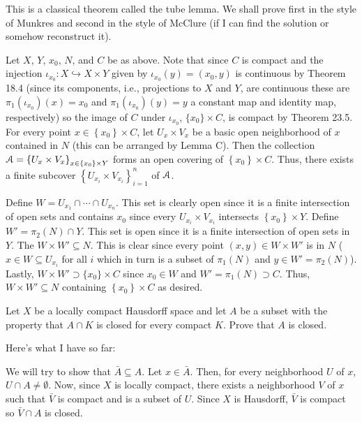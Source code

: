 \begin{solution}
  This is a classical theorem called the tube lemma. We shall prove first
  in the style of Munkres and second in the style of McClure (if I can find
  the solution or somehow reconstruct it).

  Let $X$, $Y$, $x_0$, $N$, and $C$ be as above. Note that since $C$ is
  compact and the injection $\iota_{x_0}\colon X\hookrightarrow X\times Y$
  given by $\iota_{x_0}(y)=(x_0,y)$ is continuous by Theorem 18.4 (since
  its components, i.e., projections to $X$ and $Y$, are continuous these
  are $\pi_1(\iota_{x_0})(x)=x_0$ and $\pi_1(\iota_{x_0})(y)=y$ a constant
  map and identity map, respectively) so the image of $C$ under
  $\iota_{x_0}$, $\{x_0\}\times C$, is compact by Theorem 23.5. For every
  point $x\in\left\{x_0\right\}\times C$, let $U_x\times V_x$ be a basic
  open neighborhood of $x$ contained in $N$ (this can be arranged by Lemma
  C). Then the collection
  $\mathcal{A}=\left\{U_x\times V_x\right\}_{x\in\left\{x_0\right\}\times Y}$
  forms an open covering of $\left\{x_0\right\}\times C$. Thus, there
  exists a finite subcover $\left\{U_{x_i}\times V_{x_i}\right\}_{i=1}^n$
  of $\mathcal{A}$.

  Define $W= U_{x_1}\cap\dotsb\cap U_{x_n}$. This set is clearly open since
  it is a finite intersection of open sets and contains $x_0$ since every
  $U_{x_i}\times V_{x_i}$ intersects $\left\{x_0\right\}\times Y$. Define
  $W'=\pi_2(N)\cap Y$. This set is open since it is a finite intersection
  of open sets in $Y$. The $W\times W'\subseteq N$. This is clear since every
  point $(x,y)\in W\times W'$ is in $N$ ($x\in W\subseteq U_{x_i}$ for all
  $i$ which in turn is a subset of $\pi_1(N)$ and $y\in
  W'=\pi_2(N)$). Lastly, $W\times W'\supset \{x_0\}\times C$ since
  $x_0\in W$ and $W'=\pi_1(N)\supset C$. Thus, $W\times W'\subseteq N$
  containing $\left\{x_0\right\}\times C$ as desired.
\end{solution}
\begin{problem}
  Let $X$ be a locally compact Hausdorff space and let $A$ be a subset with
  the property that $A\cap K$ is closed for every compact $K$. Prove that
  $A$ is closed.
\end{problem}
\begin{solution}
  Here's what I have so far:

  We will try to show that $\bar A\subseteq A$. Let $x\in\bar A$. Then, for
  every neighborhood $U$ of $x$, $U\cap A\neq\emptyset$. Now, since $X$ is
  locally compact, there exists a neighborhood $V$ of $x$ such that
  $\bar V$ is compact and is a subset of $U$. Since $X$ is Hausdorff,
  $\bar V$ is compact so $\bar V\cap A$ is closed.
\end{solution}
